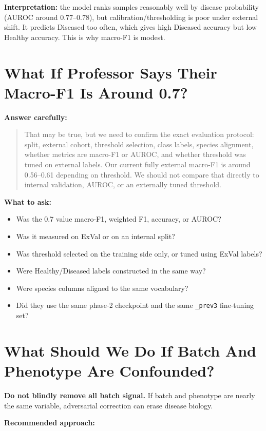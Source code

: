 \documentclass[11pt]{article}
\newcommand{\code}[1]{\texttt{\small #1}}
\begin{document}
\textbf{Interpretation:} the model ranks samples reasonably well by disease probability
(AUROC around 0.77--0.78), but calibration/thresholding is poor under external shift. It
predicts Diseased too often, which gives high Diseased accuracy but low Healthy accuracy.
This is why macro-F1 is modest.

\section{What If Professor Says Their Macro-F1 Is Around 0.7?}

\textbf{Answer carefully:}

\begin{quote}
That may be true, but we need to confirm the exact evaluation protocol: split, external
cohort, threshold selection, class labels, species alignment, whether metrics are macro-F1
or AUROC, and whether threshold was tuned on external labels. Our current fully external
macro-F1 is around 0.56--0.61 depending on threshold. We should not compare that directly
to internal validation, AUROC, or an externally tuned threshold.
\end{quote}

\textbf{What to ask:}

\begin{itemize}
  \item Was the 0.7 value macro-F1, weighted F1, accuracy, or AUROC?
  \item Was it measured on ExVal or on an internal split?
  \item Was threshold selected on the training side only, or tuned using ExVal labels?
  \item Were Healthy/Diseased labels constructed in the same way?
  \item Were species columns aligned to the same vocabulary?
  \item Did they use the same phase-2 checkpoint and the same \code{\_prev3} fine-tuning
  set?
\end{itemize}

\section{What Should We Do If Batch And Phenotype Are Confounded?}

\textbf{Do not blindly remove all batch signal.} If batch and phenotype are nearly the
same variable, adversarial correction can erase disease biology.

\textbf{Recommended approach:}
\end{document}
